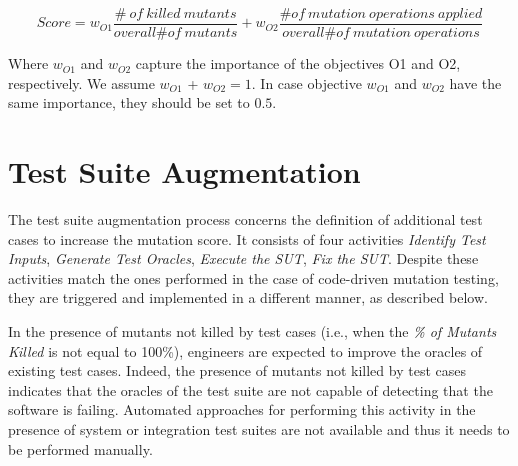 \begin{equation}
Score=w_{O1} \frac{\# \ \mathit{of}\ \mathit{killed} \ \mathit{mutants}}{\mathit{overall} \# \mathit{of}\ \mathit{mutants}} + w_{O2} \frac{\# \mathit{of}\ \mathit{mutation} \ \mathit{operations} \ \mathit{applied}}{\mathit{overall} \# \mathit{of}\ \mathit{mutation} \ \mathit{operations}}
\label{f:mutation:score}
\end{equation}

Where $w_{O1}$ and $w_{O2}$ capture the importance of the objectives O1 and O2, respectively. We assume $w_{O1}$ + $w_{O2} = 1$. In case objective $w_{O1}$ and $w_{O2}$ have the same importance, they should be set to $0.5$. 










\clearpage
\section{Test Suite Augmentation} %
\label{sec:data:test_suite_augmentation}


The test suite augmentation process concerns the definition of additional test cases to increase the mutation score.
It consists of four activities \emph{Identify Test Inputs}, \emph{Generate Test Oracles}, \emph{Execute the SUT}, \emph{Fix the SUT}. 
Despite these activities match the ones performed in the case of code-driven mutation testing, they are triggered and implemented in a different manner, as described below.

In the presence of mutants not killed by test cases (i.e., when the \emph{\% of Mutants Killed} is not equal to 100\%), engineers are expected to improve the oracles of existing test cases. Indeed, the presence of mutants not killed by test cases indicates that the oracles of the test suite are not capable of detecting that the software is failing. 
Automated approaches for performing this activity in the presence of system or integration test suites are not available and thus it needs to be performed manually.


